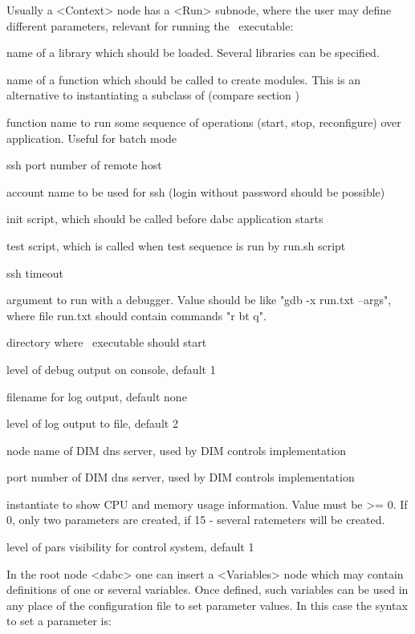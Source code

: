 Usually a <Context> node has a <Run> subnode, where the user may define different parameters, relevant for running the \dabc\ executable:

\bdes
\item[lib] name of a library which should be loaded. Several libraries can be specified.
\item[func] name of a function which should be called to create modules. 
This is an alternative to instantiating a subclass of  
(compare section )
\item[runfunc] function name to run some sequence of operations (start, stop, reconfigure) over application. Useful
for batch mode                 
\item[port] ssh port number of remote host
\item[user] account name to be used for ssh (login without password should be possible)
\item[init] init script, which should be called before dabc application starts
\item[test] test script, which is called when test sequence is run by run.sh script
\item[timeout] ssh timeout 
\item[debugger] argument to run with a debugger. Value should be like "gdb -x run.txt --args", where file run.txt should contain commands "r bt q".
\item[workdir] directory where \dabc\ executable should start
\item[debuglevel] level of debug output on console, default 1
\item[logfile] filename for log output, default none  
\item[loglevel] level of log output to file, default 2 
\item[DIM\_DNS\_NODE] node name of DIM dns server, used by DIM controls implementation 
\item[DIM\_DNS\_PORT] port number of DIM dns server, used by DIM controls implementation
\item[cpuinfo] instantiate  to show CPU and memory usage information. 
Value must be >= 0. If 0, only two parameters are created, if 15 - several ratemeters will be created.    
\item[parslevel] level of pars visibility for control system, default 1 
\edes

In the root node <dabc> one can insert a <Variables> node which may contain 
definitions of one or several variables. Once defined, 
such variables can be used in any place of the configuration file to set parameter values.
In this case the syntax to set a parameter is:

